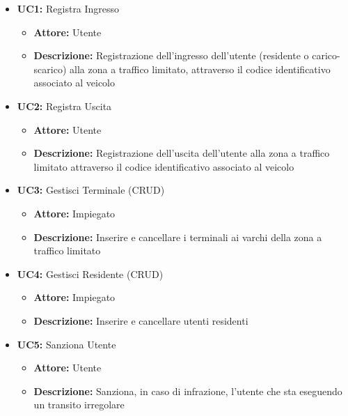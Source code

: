 \documentclass[12pt, letterpaper]{article}
\begin{document}
\begin{itemize}
    \item \textbf{UC1:} Registra Ingresso
    \begin{itemize}
        \item \textbf{Attore:} Utente
        \item \textbf{Descrizione:} Registrazione 
        dell'ingresso dell'utente (residente o 
        carico-scarico) alla zona a traffico 
        limitato, attraverso il codice identificativo 
        associato al veicolo
    \end{itemize}
    
    \item \textbf{UC2:} Registra Uscita
    \begin{itemize}
        \item \textbf{Attore:} Utente
        \item \textbf{Descrizione:} Registrazione 
        dell'uscita dell'utente alla zona a 
        traffico limitato attraverso il codice 
        identificativo associato al veicolo
    \end{itemize}

    \item \textbf{UC3:} Gestisci Terminale (CRUD)
    \begin{itemize}
        \item \textbf{Attore:} Impiegato
        \item \textbf{Descrizione:} Inserire e 
        cancellare i terminali ai varchi della 
        zona a traffico limitato
    \end{itemize}

    \item \textbf{UC4:} Gestisci Residente (CRUD)
    \begin{itemize}
        \item \textbf{Attore:} Impiegato
        \item \textbf{Descrizione:} Inserire e 
        cancellare utenti residenti
    \end{itemize}

    \item \textbf{UC5:} Sanziona Utente
    \begin{itemize}
        \item \textbf{Attore:} Utente
        \item \textbf{Descrizione:} Sanziona,
        in caso di infrazione, l'utente che sta 
        eseguendo un transito irregolare
    \end{itemize}
\end{itemize}
\end{document}

